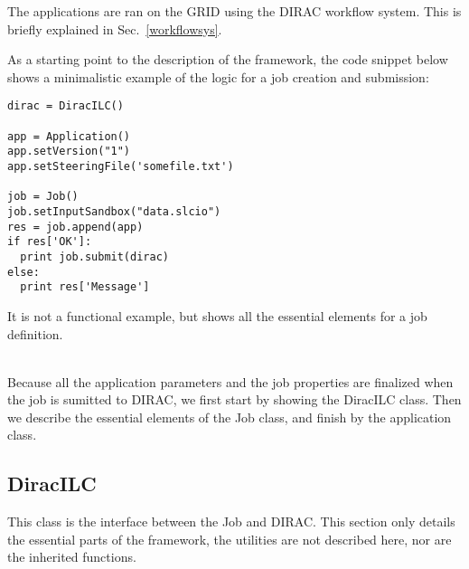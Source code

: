 \documentclass[a4paper,12pt]{article}
\begin{document}
The applications are ran on the GRID using the DIRAC workflow system. This is
briefly explained in Sec.~\ref{workflowsys}.

As a starting point to the description of the framework, the code snippet below
shows a minimalistic example of the logic for a job creation and submission: 
\begin{lstlisting}[basicstyle=\normalsize]
dirac = DiracILC()

app = Application()
app.setVersion("1")
app.setSteeringFile('somefile.txt')

job = Job()
job.setInputSandbox("data.slcio")
res = job.append(app)
if res['OK']:
  print job.submit(dirac)
else:
  print res['Message'] 
\end{lstlisting}
It is not a functional example, but shows all the essential elements for a job definition.

~\\

Because all the application parameters and the job properties are finalized
when the job is sumitted to DIRAC, we first start by showing the DiracILC class.
Then we describe the essential elements of the Job class, and finish by the
application class.

\subsection{DiracILC}\label{diracilc}
This class is the interface between the Job and DIRAC. This section only details
the essential parts of the framework, the utilities are not described here, nor
are the inherited functions.
\end{document}
